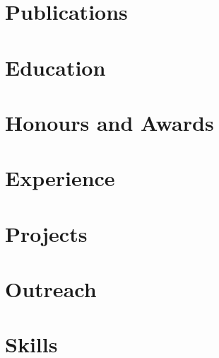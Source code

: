 \documentclass[english,a4paper,10pt,roman]{article}
\begin{document}
\thispagestyle{firstpage}



\section{Publications}


\section{Education}


\section{Honours and Awards}


\section{Experience}


\newpage
\section{Projects}


\section{Outreach}


\section{Skills}


\end{document}
